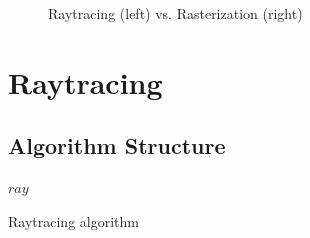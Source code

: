 \documentclass{article}
\begin{document}
\begin{figure}[!htbp]
 \centering
    \qquad
    \caption{Raytracing (left) vs. Rasterization (right)}%
    \label{fig:example}%
\end{figure}

\begin{figure}[!htbp]
 \centering
\end{figure}

\section{Raytracing}

\subsection{Algorithm Structure}
\begin{algorithm}[H]

     {
        $ray$ \leftarrow {}\\
        \BlankLine
         {
        }
    }
    \caption{Raytracing algorithm}\label{algo_raster}
\end{algorithm}
\end{document}
